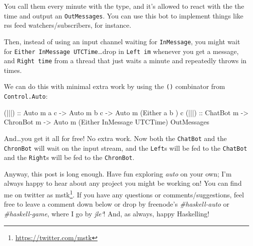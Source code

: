 \documentclass[]{article}
\newenvironment{Shaded}{}{}
\newcommand{\DataTypeTok}[1]{\textcolor[rgb]{0.56,0.13,0.00}{{#1}}}
\newcommand{\OtherTok}[1]{\textcolor[rgb]{0.00,0.44,0.13}{{#1}}}
\newcommand{\NormalTok}[1]{{#1}}
\renewcommand{\href}[2]{#2\footnote{\url{#1}}}
\begin{document}
You call them every minute with the type, and it's allowed to react with
the the time and output an \texttt{OutMessages}. You can use this bot to
implement things like rss feed watchers/subscribers, for instance.

Then, instead of using an input channel waiting for \texttt{InMessage},
you might wait for \texttt{Either\ InMessage\ UTCTime}\ldots{}drop in
\texttt{Left\ im} whenever you get a message, and \texttt{Right\ time}
from a thread that just waits a minute and repeatedly throws in times.

We can do this with minimal extra work by using the
\texttt{(\textbar{}\textbar{}\textbar{})} combinator from
\texttt{Control.Auto}:

\begin{Shaded}
\begin{Highlighting}[]
\OtherTok{(|||) ::} \DataTypeTok{Auto} \NormalTok{m a c }\OtherTok{->} \DataTypeTok{Auto} \NormalTok{m b c }\OtherTok{->} \DataTypeTok{Auto} \NormalTok{m (}\DataTypeTok{Either} \NormalTok{a         b      ) c}
\OtherTok{(|||) ::} \DataTypeTok{ChatBot} \NormalTok{m  }\OtherTok{->} \DataTypeTok{ChronBot} \NormalTok{m }\OtherTok{->} \DataTypeTok{Auto} \NormalTok{m (}\DataTypeTok{Either} \DataTypeTok{InMessage} \DataTypeTok{UTCTime}\NormalTok{) }\DataTypeTok{OutMessages}
\end{Highlighting}
\end{Shaded}

And\ldots{}you get it all for free! No extra work. Now both the
\texttt{ChatBot} and the \texttt{ChronBot} will wait on the input
stream, and the \texttt{Left}s will be fed to the \texttt{ChatBot} and
the \texttt{Right}s will be fed to the \texttt{ChronBot}.

Anyway, this post is long enough. Have fun exploring \emph{auto} on your
own; I'm always happy to hear about any project you might be working on!
You can find me on twitter as \href{https://twitter.com/mstk}{mstk}. If
you have any questions or comments/suggestions, feel free to leave a
comment down below or drop by freenode's \emph{\#haskell-auto} or
\emph{\#haskell-game}, where I go by \emph{jle`}! And, as always, happy
Haskelling!
\end{document}
